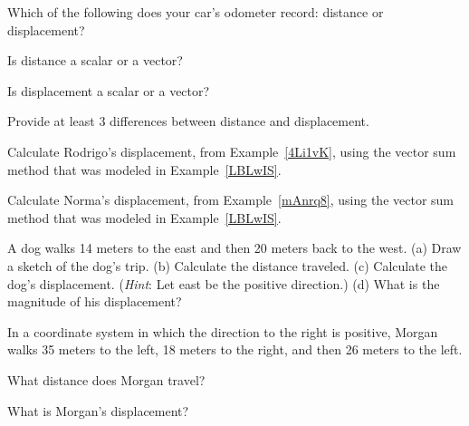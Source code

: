 \documentclass[../main.tex]{subfiles}
\begin{document}
\begin{exercise}
    Which of the following does your car's odometer record: distance or displacement?
\end{exercise}

\begin{exercise}
    Is distance a scalar or a vector?
\end{exercise}

\begin{exercise}
    Is displacement a scalar or a vector?
\end{exercise}

\begin{exercise}
    Provide at least 3 differences between distance and displacement.
\end{exercise}

\begin{exercise}
    Calculate Rodrigo's displacement, from Example~\ref{4Li1vK}, using the vector sum method that was modeled in Example~\ref{LBLwIS}.
\end{exercise}

\begin{exercise}
    Calculate Norma's displacement, from Example~\ref{mAnrq8}, using the vector sum method that was modeled in Example~\ref{LBLwIS}.
\end{exercise}

\begin{exercise} \label{xs4oMq}
A dog walks 14 meters to the east and then 20 meters back to the west.  (a) Draw a sketch of the dog's trip. (b) Calculate the distance traveled. (c) Calculate the dog's displacement. (\textit{Hint}: Let east be the positive direction.) (d) What is the magnitude of his displacement?
\end{exercise}


\cyanhrule

\vspace{1em}

In a coordinate system in which the direction to the right is positive, Morgan walks 35 meters to the left, 18 meters to the right, and then 26 meters to the left.

\begin{exercise} \label{3rT1wE}
What distance does Morgan travel?
\end{exercise}

\begin{exercise} \label{0NkeX1}
What is Morgan's displacement?
\end{exercise}
\end{document}
